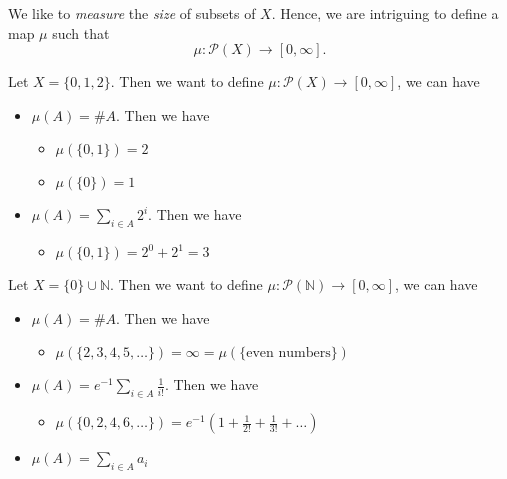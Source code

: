 We like to \emph{measure} the \emph{size} of subsets of \(X\). Hence, we are intriguing to define a map \(\mu\) such that
\[
	\mu\colon \mathcal{P}(X) \to \left[0, \infty\right].
\]
\begin{eg}
	Let \(X = \{0, 1, 2\}\). Then we want to define \(\mu\colon \mathcal{P}(X)\to \left[0, \infty\right] \), we can have
	\begin{itemize}
		\item \(\mu(A) = \# A\). Then we have
		      \begin{itemize}
			      \item \(\mu(\{0, 1\}) = 2\)
			      \item \(\mu(\{0\}) = 1\)
		      \end{itemize}
		\item \(\mu(A) = \sum\limits_{i\in A} 2^i\). Then we have
		      \begin{itemize}
			      \item \(\mu(\{0, 1\}) = 2^0 + 2^1 = 3\)
		      \end{itemize}
	\end{itemize}
\end{eg}
\begin{eg}
	Let \(X = \{0\}\cup \mathbb{N} \). Then we want to define \(\mu\colon \mathcal{P}(\mathbb{N} )\to \left[0, \infty\right] \), we can have
	\begin{itemize}
		\item \(\mu(A) = \# A\). Then we have
		      \begin{itemize}
			      \item \(\mu(\{2, 3, 4, 5, \dots  \}) = \infty = \mu(\{\text{even numbers} \})\)
		      \end{itemize}
		\item \(\mu(A) = e^{-1}\sum\limits_{i\in A}\frac{1}{i!}\). Then we have
		      \begin{itemize}
			      \item \(\mu(\{0, 2, 4, 6, \dots \}) = e^{-1} \left(1+\frac{1}{2!}+\frac{1}{3!}+\dots  \right)\)
		      \end{itemize}
		\item \(\mu(A) = \sum\limits_{i\in A} a_{i}\)
	\end{itemize}
\end{eg}
